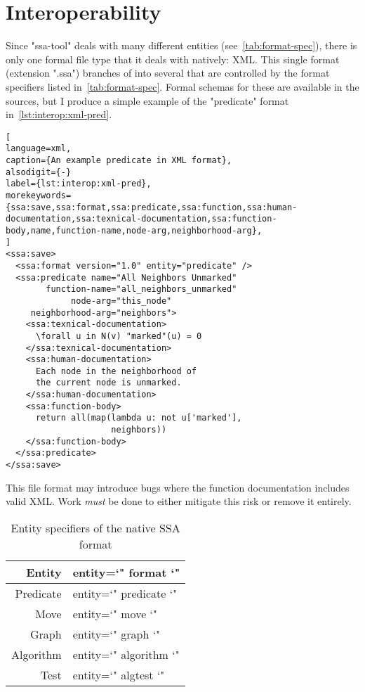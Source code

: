 \section{Interoperability}
\label{sec:iface-interoperability}
Since "ssa-tool" deals with many different entities (see~\autoref{tab:format-spec}),
  there is only one formal file type that it deals with natively: XML.
This single format (extension ".ssa") branches of into several 
  that are controlled by the format specifiers listed in~\autoref{tab:format-spec}.
Formal schemas for these are available in the sources,
  but I produce a simple example of the "predicate" format in~\autoref{lst:interop:xml-pred}.
\begin{lstlisting}[
language=xml,
caption={An example predicate in XML format},
alsodigit={-}
label={lst:interop:xml-pred},
morekeywords={ssa:save,ssa:format,ssa:predicate,ssa:function,ssa:human-documentation,ssa:texnical-documentation,ssa:function-body,name,function-name,node-arg,neighborhood-arg},
]
<ssa:save>
  <ssa:format version="1.0" entity="predicate" />
  <ssa:predicate name="All Neighbors Unmarked"
        function-name="all_neighbors_unmarked"
             node-arg="this_node"
     neighborhood-arg="neighbors">
    <ssa:texnical-documentation>
      \forall u in N(v) "marked"(u) = 0
    </ssa:texnical-documentation>
    <ssa:human-documentation>
      Each node in the neighborhood of
      the current node is unmarked.
    </ssa:human-documentation>
    <ssa:function-body>
      return all(map(lambda u: not u['marked'],
                     neighbors))
    </ssa:function-body>
  </ssa:predicate>
</ssa:save>
\end{lstlisting}
\begin{warning}[2]
  This file format may introduce bugs where the function documentation includes valid XML.
  Work \emph{must} be done to either mitigate this risk or remove it entirely.
\end{warning}

\begin{table}
  \centering
  \begin{tabular}{r>{\ttfamily\small entity=\char`"}l<{\char`"}}
    \toprule
    Entity    & format    \\
    \midrule
    Predicate & predicate \\
    Move      & move      \\
    Graph     & graph     \\
    Algorithm & algorithm \\
    Test      & algtest   \\
    \bottomrule
  \end{tabular}
  \caption{Entity specifiers of the native SSA format}
  \label{tab:format-spec}
\end{table}

